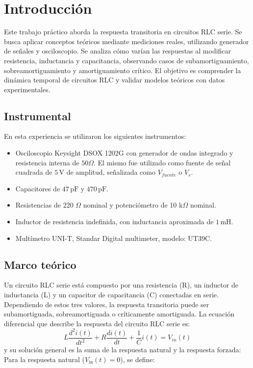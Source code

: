 \documentclass{article}
\begin{document}
\newpage

\tableofcontents %
\newpage

\section{Introducción}
    Este trabajo práctico aborda la respuesta transitoria
     en circuitos RLC serie. Se busca aplicar conceptos 
     teóricos mediante mediciones reales, utilizando generador 
     de señales y osciloscopio. Se analiza cómo varían las
      respuestas al modificar resistencia, inductancia y 
      capacitancia, observando casos de subamortiguamiento,
       sobreamortiguamiento y amortiguamiento crítico. 
       El objetivo es comprender la dinámica temporal 
       de circuitos RLC y validar modelos teóricos
       con datos experimentales.
    \subsection{Instrumental}
        En esta experiencia se utilizaron los siguientes instrumentos:
\begin{itemize}
  \item Osciloscopio Keysight DSOX 1202G con generador de ondas integrado y resistencia interna de $50 \Omega$. El mismo fue utilizado como fuente de señal cuadrada de $5\,\text{V}$ de amplitud, señalizada como $V_{fuente}$ o $ V_s$.
  \item Capacitores de $47\,\text{pF}$ y $470\,\text{pF}$.
  \item Resistencias de 220 $\Omega$ nominal y potenciómetro de 10 k$\Omega$ nominal.
  \item Inductor de resistencia indefinida, con inductancia aproximada de $1\,\text{mH}$.
  \item Multímetro UNI-T,  Standar Digital multimeter, modelo: UT39C.
\end{itemize}

\subsection{Marco teórico}

    Un circuito RLC serie está compuesto por una resistencia (R), un inductor de inductancia (L) y un capacitor de
    capacitancia (C) conectadas en serie. Dependiendo de estos tres valores, la respuesta transitoria
    puede ser subamortiguada, sobreamortiguada o críticamente 
    amortiguada. La ecuación diferencial que describe la 
    respuesta del circuito RLC serie es:
    \begin{equation}
        L\frac{d^2i(t)}{dt^2} + R\frac{di(t)}{dt} + \frac{1}{C}i(t) = V_{in}(t)
    \end{equation}
    y su solución general es la suma de la respuesta natural y la respuesta forzada:
Para la respuesta natural (\( V_{\text{in}}(t) = 0 \)), se define:
\end{document}
